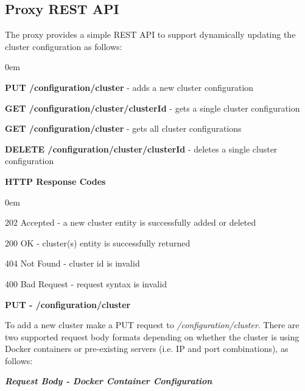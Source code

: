 \documentclass[a4paper,11pt,twoside]{report}
\begin{document}
\begin{appendices}
\chapter[Proxy REST API]{\huge Proxy REST API}\label{Appendix I}
The proxy provides a simple REST API to support dynamically updating the cluster configuration as follows:

\begin{list}{-}{}
  \itemsep0em
  \item \textbf{PUT /configuration/cluster} - adds a new cluster configuration  
 \item\textbf{GET /configuration/cluster/{clusterId}} - gets a single cluster configuration
 \item\textbf{GET /configuration/cluster} - gets all cluster configurations
 \item\textbf{DELETE /configuration/cluster/{clusterId}} - deletes a single cluster configuration
\end{list}

\noindent
\textbf{HTTP Response Codes}
\begin{list}{-}{}
  \itemsep0em
\item 202 Accepted - a new cluster entity is successfully added or deleted 
\item 200 OK - cluster(s) entity is successfully returned   
\item 404 Not Found - cluster id is invalid
\item 400 Bad Request - request syntax is  invalid
\end{list}

\noindent
\textbf{PUT - /configuration/cluster}

\noindent
To add a new cluster make a PUT request to \textit{/configuration/cluster}.  There are two supported request body formats depending on whether the cluster is using Docker containers or pre-existing servers (i.e. IP and port combinations), as follows:\bigskip

\noindent
\textit{\textbf{Request Body - Docker Container Configuration}}


\end{appendices}
\end{document}
